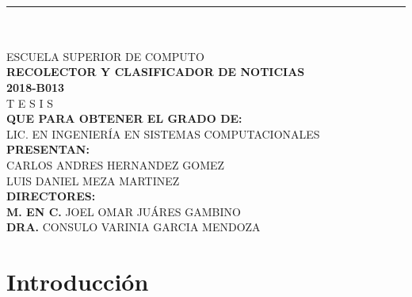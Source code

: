 \documentclass{book}
\begin{document}
\begin{titlepage}
\begin{minipage}{.8\textwidth}
{       \\

      \rule{\textwidth}{1pt}\\
      \hrulefill\\[1cm]

      \LARGE{E}\large{SCUELA} \LARGE{S}\large{UPERIOR} \large{DE} \LARGE{C}\large{OMPUTO}\\[1cm]

      \textbf{ \LARGE{R}\large{ECOLECTOR} \large{Y} \LARGE{C}\large{LASIFICADOR} \large{DE}  
      \LARGE{N}\large{OTICIAS}}\\[1cm]
      \large{\textbf{2018-B013}}\\[1cm]

      \huge{T \hspace{1cm} E \hspace{1cm} S \hspace{1cm} I \hspace{1cm} S  }\\[1cm]

      \large{\textbf{QUE PARA OBTENER EL GRADO DE:}}\\[1cm]
      \large{LIC. EN INGENIERÍA EN SISTEMAS COMPUTACIONALES  }\\[1cm]

      \large{\textbf{PRESENTAN:}}\\[1cm]
      \large{CARLOS ANDRES HERNANDEZ GOMEZ}\\
      \large{LUIS DANIEL MEZA MARTINEZ}\\[1cm]


      \large{\textbf{DIRECTORES:  }}\\[.5cm]
      \large{\textbf{M. EN C.} JOEL OMAR JUÁRES GAMBINO }\\
      \large{\textbf{DRA.} CONSULO VARINIA GARCIA MENDOZA }\\[0.5cm]

    }

  \end{minipage}
  \end{titlepage}

  \tableofcontents



\chapter{Introducción}\label{chp:introduccion}
\end{document}
